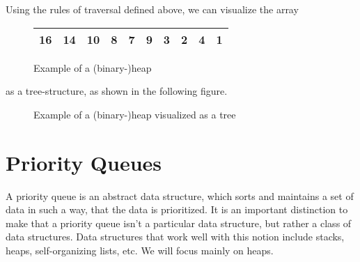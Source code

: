 \newpage
\noindent Using the rules of traversal defined above, we can visualize the
array
\begin{figure}[H]
	\center
	\begin{tabular}{|c|c|c|c|c|c|c|c|c|c|}
		\hline 16 & 14 & 10 & 8 & 7 & 9 & 3 & 2 & 4 & 1 \\ \hline
	\end{tabular}
	\caption{Example of a (binary-)heap}
	\label{fig:heap-array}
\end{figure}
as a tree-structure, as shown in the following figure.
\begin{figure}[H]
	\center
	\caption{Example of a (binary-)heap visualized as a tree}
	\label{fig:heap-tree}
\end{figure}

\section{Priority Queues}
\label{ch:heaps|sub:priorityqueues}
A priority queue is an abstract data structure, which sorts and maintains a
set of data in such a way, that the data is prioritized. It is an important
distinction to make that a priority queue isn't a particular data structure,
but rather a class of data structures. Data structures that work well with
this notion include stacks, heaps, self-organizing lists, etc. We will focus
mainly on heaps.

